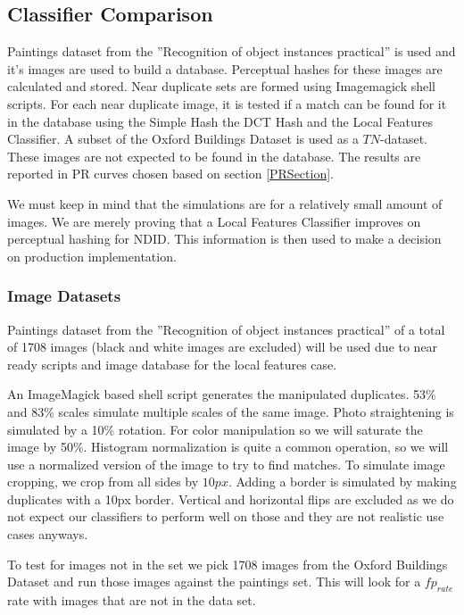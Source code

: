 \documentclass[english,12pt,a4paper,pdftex,elec,utf8]{aaltothesis}
\begin{document}
\subsection{Classifier Comparison}
Paintings dataset from the ''Recognition of object instances practical'' \cite{Vedaldi2012} is used and it's images are used to build a database. Perceptual hashes for these images are calculated and stored. Near duplicate sets are formed using Imagemagick shell scripts. For each near duplicate image, it is tested if a match can be found for it in the database using the Simple Hash the DCT Hash and the Local Features Classifier. A subset of the Oxford Buildings Dataset \cite{PhilbinJamesArandjelovicReljaZisserman2012} is used as a $TN$-dataset. These images are not expected to be found in the database. The results are reported in PR curves chosen based on section \ref{PRSection}.

We must keep in mind that the simulations are for a relatively small amount of images. We are merely proving that a Local Features Classifier improves on perceptual hashing for NDID. This information is then used to make a decision on production implementation.

\subsubsection{Image Datasets}
Paintings dataset from the ''Recognition of object instances practical'' \cite{Vedaldi2012} of a total of 1708 images (black and white images are excluded) will be used due to near ready scripts and image database for the local features case.

An ImageMagick based shell script generates the manipulated duplicates. 53\% and 83\% scales simulate multiple scales of the same image. Photo straightening is simulated by a 10\% rotation. For color manipulation so we will saturate the image by 50\%. Histogram normalization is quite a common operation, so we will use a normalized version of the image to try to find matches. To simulate image cropping, we crop from all sides by $10px$. Adding a border is simulated by making duplicates with a 10px border. Vertical and horizontal flips are excluded as we do not expect our classifiers to perform well on those and they are not realistic use cases anyways.

To test for images not in the set we pick 1708 images from the Oxford Buildings Dataset \cite{PhilbinJamesArandjelovicReljaZisserman2012} and run those images against the paintings set. This will look for a $fp_{rate}$ rate with images that are not in the data set.
\end{document}
